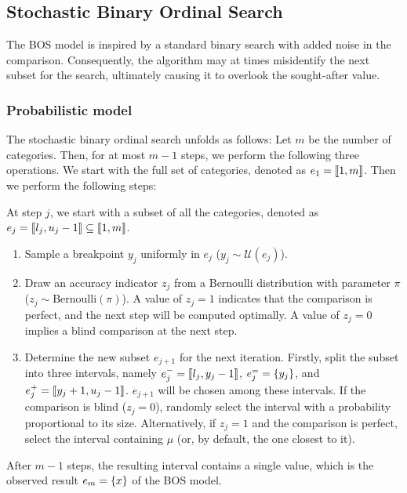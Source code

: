 
\subsection{Stochastic Binary Ordinal Search} 

The BOS model is inspired by a standard binary search with added noise in the comparison. Consequently, the algorithm may at times misidentify the next subset for the search, ultimately causing it to overlook the sought-after value.


\subsubsection{Probabilistic model}

The stochastic binary ordinal search unfolds as follows: Let $m$ be the number of categories. Then, for at most $m-1$ steps, we perform the following three operations.
We start with the full set of categories, denoted as $e_1 = \left\llbracket1,m\right\rrbracket$. Then we perform the following steps:

At step $j$, we start with a subset of all the categories, denoted as $e_j = \left\llbracket l_j, u_j - 1\right\rrbracket \subseteq \left\llbracket1,m\right\rrbracket$.

\begin{enumerate}
    \item Sample a breakpoint $y_j$ uniformly in $e_j$ ($y_j \sim \mathcal{U}(e_j)$).
    \item Draw an accuracy indicator $z_j$ from a Bernoulli distribution with parameter $\pi$ ($z_j \sim \text{Bernoulli}(\pi)$).
    A value of $z_j=1$ indicates that the comparison is perfect, and the next step will be computed optimally. A value of $z_j=0$ implies a blind comparison at the next step.
    \item Determine the new subset $e_{j+1}$ for the next iteration. Firstly, split the subset into three intervals, namely $e_j^- = \left\llbracket l_j, y_j - 1\right\rrbracket$, $e_j^= = \left\{ y_j \right\}$, and $e_j^+ = \left\llbracket y_j + 1, u_j - 1\right\rrbracket$. $e_{j+1}$ will be chosen among these intervals. If the comparison is blind ($z_j=0$), randomly select the interval with a probability proportional to its size. Alternatively, if $z_j=1$ and the comparison is perfect, select the interval containing $\mu$ (or, by default, the one closest to it).
\end{enumerate}
After $m-1$ steps, the resulting interval contains a single value, which is the observed result $e_m=\left\{ x \right\}$ of the BOS model.


